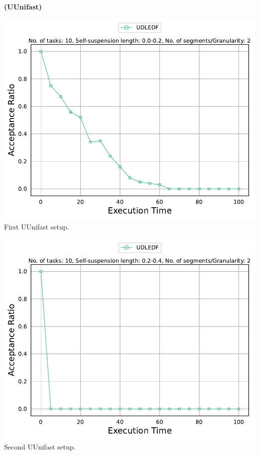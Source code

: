 \documentclass[]{article}
\begin{document}
	\begin{minipage}[t]{0.48\linewidth}
		\centering
		\textbf{(UUnifast)}
		\vspace{0.3cm}
		
		\includegraphics[width=\linewidth]{UDLEDF[2][0.0-0.2][10].pdf}
		First UUnifast setup.
		\vspace{0.3cm}
		
		\includegraphics[width=\linewidth]{UDLEDF[2][0.2-0.4][10].pdf}
		Second UUnifast setup.
		\vspace{0.3cm}
		

\end{minipage}
\end{document}
